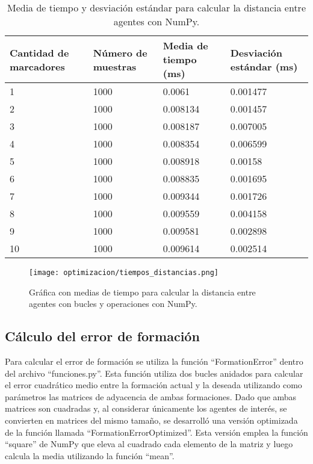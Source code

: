 \begin{table}[H]
	\centering
	\resizebox{\textwidth}{!} {
	\begin{tabular}{|l|l|l|l|}
		\hline
		\textbf{Cantidad de marcadores} & \textbf{Número de muestras} & \textbf{Media de tiempo (ms)} & \textbf{Desviación estándar (ms)} \\ \hline
		1 & 1000 & 0.0061 & 0.001477 \\ \hline
		2 & 1000 & 0.008134 & 0.001457 \\ \hline
		3 & 1000 & 0.008187 & 0.007005 \\ \hline
		4 & 1000 & 0.008354 & 0.006599 \\ \hline
		5 & 1000 & 0.008918 & 0.00158 \\ \hline
		6 & 1000 & 0.008835 & 0.001695 \\ \hline
		7 & 1000 & 0.009344 & 0.001726 \\ \hline
		8 & 1000 & 0.009559 & 0.004158 \\ \hline
		9 & 1000 & 0.009581 & 0.002898 \\ \hline
		10 & 1000 & 0.009614 & 0.002514 \\ \hline
	\end{tabular}}
	\caption{Media de tiempo y desviación estándar para calcular la distancia entre agentes con NumPy.}
	\label{cuadro:tiempos_distancias_numpy}
\end{table}

\begin{figure}[H]
	\centering
	\texttt{[image: optimizacion/tiempos\_distancias.png]}
	\caption{Gráfica con medias de tiempo para calcular la distancia entre agentes con bucles y operaciones con NumPy.}
	\label{fig:grafica_tiempos_distancias}
\end{figure}

\subsection{Cálculo del error de formación}
Para calcular el error de formación se utiliza la función ``FormationError'' dentro del archivo ``funciones.py''. Esta función utiliza dos bucles anidados para calcular el error cuadrático medio entre la formación actual y la deseada utilizando como parámetros las matrices de adyacencia de ambas formaciones. Dado que ambas matrices son cuadradas y, al considerar únicamente los agentes de interés, se convierten en matrices del mismo tamaño, se desarrolló una versión optimizada de la función llamada ``FormationErrorOptimized''. Esta versión emplea la función ``square'' de NumPy que eleva al cuadrado cada elemento de la matriz y luego calcula la media utilizando la función ``mean''.


